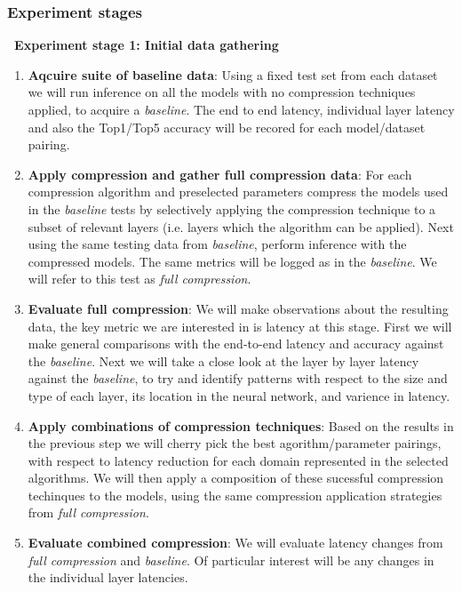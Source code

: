 \documentclass[../../D1.tex]{subfiles}
\begin{document}
\subsubsection{Experiment stages}
\textbf{\large~Experiment stage 1: Initial data gathering}
\begin{enumerate}
    \item \textbf{Aqcuire suite of baseline data}: Using a fixed test set from each dataset we will run inference on all the models with no compression techniques applied, to acquire a \emph{baseline}. The end to end latency, individual layer latency and also the Top1/Top5 accuracy will be recored for each model/dataset pairing.
    \item \textbf{Apply compression and gather full compression data}: For each compression algorithm and preselected parameters compress the models used in the \emph{baseline} tests by selectively applying the compression technique to a subset of relevant layers (i.e. layers which the algorithm can be applied). Next using the same testing data from \emph{baseline}, perform inference with the compressed models. The same metrics will be logged as in the \emph{baseline}. We will refer to this test as \emph{full compression}.
    \item \textbf{Evaluate full compression}: We will make observations about the resulting data, the key metric we are interested in is latency at this stage. First we will make general comparisons with the end-to-end latency and accuracy against the \emph{baseline}. Next we will take a close look at the layer by layer latency against the \emph{baseline}, to try and identify patterns with respect to the size and type of each layer, its location in the neural network, and varience in latency. 
    \item \textbf{Apply combinations of compression techniques}: Based on the results in the previous step we will cherry pick the best agorithm/parameter pairings, with respect to latency reduction for each domain represented in the selected algorithms. We will then apply a composition of these sucessful compression techinques to the models, using the same compression application strategies from \emph{full compression}.
    \item \textbf{Evaluate combined compression}: We will evaluate latency changes from \emph{full compression} and \emph{baseline}. Of particular interest will be any changes in the individual layer latencies.
\end{enumerate}
\end{document}
